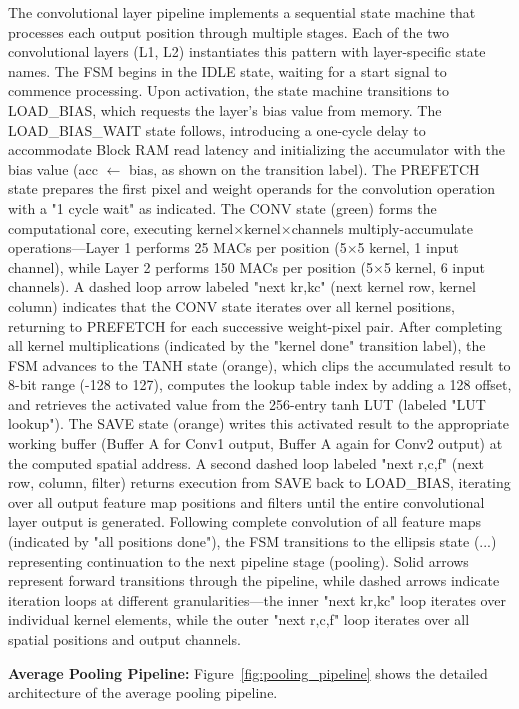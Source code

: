 \documentclass[12pt,a4paper]{report}
\begin{document}
The convolutional layer pipeline implements a sequential state machine that processes each output position through multiple stages. Each of the two convolutional layers (L1, L2) instantiates this pattern with layer-specific state names. The FSM begins in the IDLE state, waiting for a start signal to commence processing. Upon activation, the state machine transitions to LOAD\_BIAS, which requests the layer's bias value from memory. The LOAD\_BIAS\_WAIT state follows, introducing a one-cycle delay to accommodate Block RAM read latency and initializing the accumulator with the bias value (acc $\leftarrow$ bias, as shown on the transition label). The PREFETCH state prepares the first pixel and weight operands for the convolution operation with a "1 cycle wait" as indicated. The CONV state (green) forms the computational core, executing kernel$\times$kernel$\times$channels multiply-accumulate operations—Layer 1 performs 25 MACs per position (5$\times$5 kernel, 1 input channel), while Layer 2 performs 150 MACs per position (5$\times$5 kernel, 6 input channels). A dashed loop arrow labeled "next kr,kc" (next kernel row, kernel column) indicates that the CONV state iterates over all kernel positions, returning to PREFETCH for each successive weight-pixel pair. After completing all kernel multiplications (indicated by the "kernel done" transition label), the FSM advances to the TANH state (orange), which clips the accumulated result to 8-bit range (-128 to 127), computes the lookup table index by adding a 128 offset, and retrieves the activated value from the 256-entry tanh LUT (labeled "LUT lookup"). The SAVE state (orange) writes this activated result to the appropriate working buffer (Buffer A for Conv1 output, Buffer A again for Conv2 output) at the computed spatial address. A second dashed loop labeled "next r,c,f" (next row, column, filter) returns execution from SAVE back to LOAD\_BIAS, iterating over all output feature map positions and filters until the entire convolutional layer output is generated. Following complete convolution of all feature maps (indicated by "all positions done"), the FSM transitions to the ellipsis state (...) representing continuation to the next pipeline stage (pooling). Solid arrows represent forward transitions through the pipeline, while dashed arrows indicate iteration loops at different granularities—the inner "next kr,kc" loop iterates over individual kernel elements, while the outer "next r,c,f" loop iterates over all spatial positions and output channels.

\textbf{Average Pooling Pipeline:} Figure~\ref{fig:pooling_pipeline} shows the detailed architecture of the average pooling pipeline.
\end{document}
